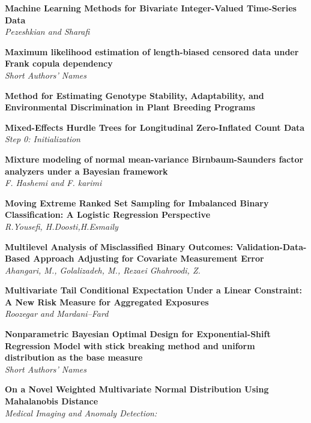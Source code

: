 \noindent
{\bf
Machine Learning Methods for Bivariate Integer-Valued Time‑Series Data
}\dotfill \pageref{p.1043}\\
{\small \it
Pezeshkian and Sharafi
}


\noindent
{\bf
Maximum likelihood estimation of length-biased censored data under Frank copula dependency
}\dotfill \pageref{p.1073}\\
{\small \it
Short Authors' Names
}


\noindent
{\bf
Method for Estimating Genotype Stability, Adaptability, and Environmental Discrimination in Plant Breeding Programs
}\dotfill \pageref{p.1094}\\
{\small \it

}


\noindent
{\bf
Mixed-Effects Hurdle Trees for Longitudinal Zero-Inflated Count Data
}\dotfill \pageref{p.1300}\\
{\small \it
Step 0: Initialization
}


\noindent
{\bf
Mixture modeling of normal mean-variance Birnbaum-Saunders factor analyzers under a Bayesian framework
}\dotfill \pageref{p.1186}\\
{\small \it
F. Hashemi and F. karimi
}


\noindent
{\bf
Moving Extreme Ranked Set Sampling for Imbalanced Binary Classification: A Logistic Regression Perspective
}\dotfill \pageref{p.1092}\\
{\small \it
R.Yousefi, H.Doosti,H.Esmaily
}


\noindent
{\bf
Multilevel Analysis of Misclassified Binary Outcomes: Validation-Data-Based Approach Adjusting for Covariate Measurement Error
}\dotfill \pageref{p.1216}\\
{\small \it
Ahangari, M., Golalizadeh, M., Rezaei Ghahroodi, Z.
}


\noindent
{\bf
Multivariate Tail Conditional Expectation Under a Linear Constraint: A New Risk Measure for Aggregated Exposures
}\dotfill \pageref{p.1210}\\
{\small \it
Roozegar and Mardani--Fard
}


\noindent
{\bf
Nonparametric Bayesian Optimal Design for Exponential-Shift Regression Model with stick breaking method and uniform distribution as the base measure
}\dotfill \pageref{p.1262}\\
{\small \it
Short Authors' Names
}


\noindent
{\bf
On a Novel Weighted Multivariate Normal Distribution Using Mahalanobis Distance
}\dotfill \pageref{p.1100}\\
{\small \it
Medical Imaging and Anomaly Detection:
}


